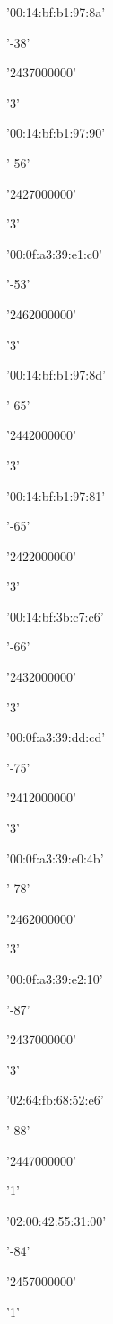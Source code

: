 \documentclass[11pt]{article}
\begin{document}
    
    \begin{enumerate*}
\item '00:14:bf:b1:97:8a'
\item '-38'
\item '2437000000'
\item '3'
\item '00:14:bf:b1:97:90'
\item '-56'
\item '2427000000'
\item '3'
\item '00:0f:a3:39:e1:c0'
\item '-53'
\item '2462000000'
\item '3'
\item '00:14:bf:b1:97:8d'
\item '-65'
\item '2442000000'
\item '3'
\item '00:14:bf:b1:97:81'
\item '-65'
\item '2422000000'
\item '3'
\item '00:14:bf:3b:c7:c6'
\item '-66'
\item '2432000000'
\item '3'
\item '00:0f:a3:39:dd:cd'
\item '-75'
\item '2412000000'
\item '3'
\item '00:0f:a3:39:e0:4b'
\item '-78'
\item '2462000000'
\item '3'
\item '00:0f:a3:39:e2:10'
\item '-87'
\item '2437000000'
\item '3'
\item '02:64:fb:68:52:e6'
\item '-88'
\item '2447000000'
\item '1'
\item '02:00:42:55:31:00'
\item '-84'
\item '2457000000'
\item '1'
\end{enumerate*}
\end{document}
